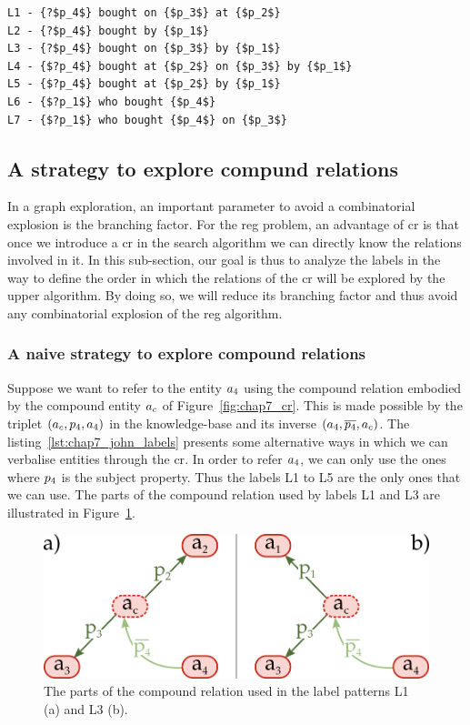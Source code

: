 \begin{lstlisting}[frame=single, caption={ A part of the label set of the purchase compound relation.}, label={lst:chap7_john_labels}, captionpos=b, style=Labels, mathescape=true]
L1 - {?$p_4$} bought on {$p_3$} at {$p_2$}
L2 - {?$p_4$} bought by {$p_1$}
L3 - {?$p_4$} bought on {$p_3$} by {$p_1$}
L4 - {$?p_4$} bought at {$p_2$} on {$p_3$} by {$p_1$}
L5 - {$?p_4$} bought at {$p_2$} by {$p_1$}
L6 - {$?p_1$} who bought {$p_4$}
L7 - {$?p_1$} who bought {$p_4$} on {$p_3$}
\end{lstlisting}

\subsection{A strategy to explore compund relations}

In a graph exploration, an important parameter to avoid a combinatorial explosion is the branching factor. For the \acrshort{reg} problem, an advantage of \acrshort{cr} is that once we introduce a \acrshort{cr} in the search algorithm we can directly know the relations involved in it. In this sub-section, our goal is thus to analyze the labels in the way to define the order in which the relations of the \acrshort{cr} will be explored by the upper algorithm. By doing so, we will reduce its branching factor and thus avoid any combinatorial explosion of the \acrshort{reg} algorithm.

\subsubsection{A naive strategy to explore compound relations}

Suppose we want to refer to the entity $a_4$ using the compound relation embodied by the compound entity $a_c$ of Figure~\ref{fig:chap7_cr}. This is made possible by the triplet $(a_c,p_4,a_4)$ in the knowledge-base and its inverse $(a_4, \overline{p_4}, a_c)$. The listing~\ref{lst:chap7_john_labels} presents some alternative ways in which we can verbalise entities through the \acrshort{cr}. In order to refer $a_4$, we can only use the ones where $p_4$ is the subject property. Thus the labels L1 to L5 are the only ones that we can use. The parts of the compound relation used by labels L1 and L3 are illustrated in Figure~\ref{fig:chap7_cr_part}.

\begin{figure}[ht!]
\centering
\includegraphics[scale=0.4]{figures/chapter7/CR_part.png}
\caption{\label{fig:chap7_cr_part} The parts of the compound relation used in the label patterns L1 (a) and L3 (b).}
\end{figure}

